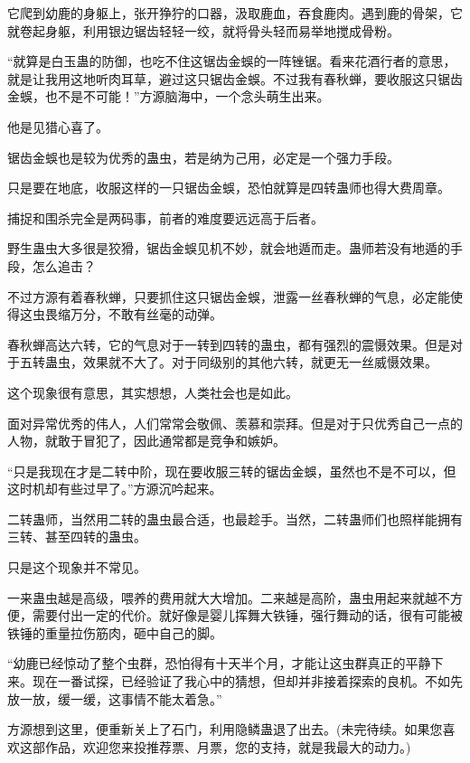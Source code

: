 \begin{this_body}
它爬到幼鹿的身躯上，张开狰狞的口器，汲取鹿血，吞食鹿肉。遇到鹿的骨架，它就卷起身躯，利用银边锯齿轻轻一绞，就将骨头轻而易举地搅成骨粉。

“就算是白玉蛊的防御，也吃不住这锯齿金蜈的一阵锉锯。看来花酒行者的意思，就是让我用这地听肉耳草，避过这只锯齿金蜈。不过我有春秋蝉，要收服这只锯齿金蜈，也不是不可能！”方源脑海中，一个念头萌生出来。

他是见猎心喜了。

锯齿金蜈也是较为优秀的蛊虫，若是纳为己用，必定是一个强力手段。

只是要在地底，收服这样的一只锯齿金蜈，恐怕就算是四转蛊师也得大费周章。

捕捉和围杀完全是两码事，前者的难度要远远高于后者。

野生蛊虫大多很是狡猾，锯齿金蜈见机不妙，就会地遁而走。蛊师若没有地遁的手段，怎么追击？

不过方源有着春秋蝉，只要抓住这只锯齿金蜈，泄露一丝春秋蝉的气息，必定能使得这虫畏缩万分，不敢有丝毫的动弹。

春秋蝉高达六转，它的气息对于一转到四转的蛊虫，都有强烈的震慑效果。但是对于五转蛊虫，效果就不大了。对于同级别的其他六转，就更无一丝威慑效果。

这个现象很有意思，其实想想，人类社会也是如此。

面对异常优秀的伟人，人们常常会敬佩、羡慕和崇拜。但是对于只优秀自己一点的人物，就敢于冒犯了，因此通常都是竞争和嫉妒。

“只是我现在才是二转中阶，现在要收服三转的锯齿金蜈，虽然也不是不可以，但这时机却有些过早了。”方源沉吟起来。

二转蛊师，当然用二转的蛊虫最合适，也最趁手。当然，二转蛊师们也照样能拥有三转、甚至四转的蛊虫。

只是这个现象并不常见。

一来蛊虫越是高级，喂养的费用就大大增加。二来越是高阶，蛊虫用起来就越不方便，需要付出一定的代价。就好像是婴儿挥舞大铁锤，强行舞动的话，很有可能被铁锤的重量拉伤筋肉，砸中自己的脚。

“幼鹿已经惊动了整个虫群，恐怕得有十天半个月，才能让这虫群真正的平静下来。现在一番试探，已经验证了我心中的猜想，但却并非接着探索的良机。不如先放一放，缓一缓，这事情不能太着急。”

方源想到这里，便重新关上了石门，利用隐鳞蛊退了出去。(未完待续。如果您喜欢这部作品，欢迎您来投推荐票、月票，您的支持，就是我最大的动力。)

\end{this_body}

